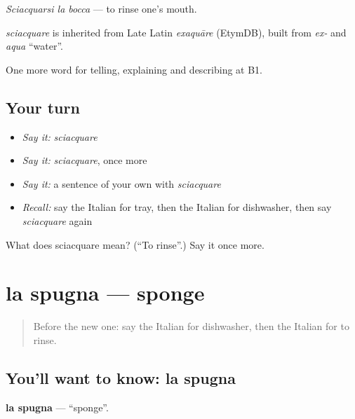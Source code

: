 \emph{Sciacquarsi la bocca} — to rinse one's mouth.

\begin{cousinweb}
\emph{sciacquare} is inherited from Late Latin \emph{exaquāre} (EtymDB), built from \emph{ex-} and \emph{aqua} \textquotedblleft{}water\textquotedblright{}.
\end{cousinweb}

\begin{grammarlens}[title={What you've built}]
One more word for telling, explaining and describing at B1.
\end{grammarlens}

\subsection*{Your turn}
\begin{itemize}
\raggedright
  \item \emph{Say it:} \emph{sciacquare}
  \item \emph{Say it:} \emph{sciacquare}, once more
  \item \emph{Say it:} a sentence of your own with \emph{sciacquare}
  \item \emph{Recall:} say the Italian for tray, then the Italian for dishwasher, then say \emph{sciacquare} again
\end{itemize}

\begin{tcolorbox}[breakable,colback=teal!4,colframe=teal!35!black,title={Before you move on}]
What does sciacquare mean? (\textquotedblleft{}To rinse\textquotedblright{}.) Say it once more.
\end{tcolorbox}
\section[la spugna]{la spugna — sponge}

\label{lesson:IT-C534-spugna}



\begin{quote}
Before the new one: say the Italian for dishwasher, then the Italian for to rinse.
\end{quote}

\subsection*{You'll want to know: la spugna}
\textbf{la spugna} — \textquotedblleft{}sponge\textquotedblright{}.

